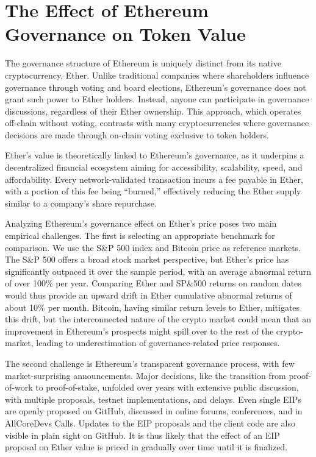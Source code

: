 \documentclass[No]{AEA}
\begin{document}
\section{The Effect of Ethereum Governance on Token Value}

The governance structure of Ethereum is uniquely distinct from its native cryptocurrency, Ether. Unlike traditional companies where shareholders influence governance through voting and board elections, Ethereum's governance does not grant such power to Ether holders. Instead, anyone can participate in governance discussions, regardless of their Ether ownership. This approach, which operates off-chain without voting, contrasts with many cryptocurrencies where governance decisions are made through on-chain voting exclusive to token holders.

Ether's value is theoretically linked to Ethereum's governance, as it underpins a decentralized financial ecosystem aiming for accessibility, scalability, speed, and affordability. Every network-validated transaction incurs a fee payable in Ether, with a portion of this fee being ``burned,'' effectively reducing the Ether supply similar to a company's share repurchase.

Analyzing Ethereum's governance effect on Ether's price poses two main empirical challenges. The first is selecting an appropriate benchmark for comparison. We use the S\&P 500 index and Bitcoin price as reference markets. The S\&P 500 offers a broad stock market perspective, but Ether's price has significantly outpaced it over the sample period, with an average abnormal return of over 100\% per year. Comparing Ether and SP\&500 returns on random dates would thus provide an upward drift in Ether cumulative abnormal returns of about 10\% per month.  Bitcoin, having similar return levels to Ether, mitigates this drift, but the interconnected nature of the crypto market could mean that an improvement in Ethereum's prospects might spill over to the rest of the crypto-market, leading to underestimation of governance-related price responses.

The second challenge is Ethereum's transparent governance process, with few market-surprising announcements. Major decisions, like the transition from proof-of-work to proof-of-stake, unfolded over years with extensive public discussion, with multiple proposals, testnet implementations, and delays. Even single EIPs are openly proposed on GitHub, discussed in online forums, conferences, and in AllCoreDevs Calls. Updates to the EIP proposals and the client code are also visible in plain sight on GitHub. It is thus likely that the effect of an EIP proposal on Ether value is priced in gradually over time until it is finalized.
 
\end{document}

